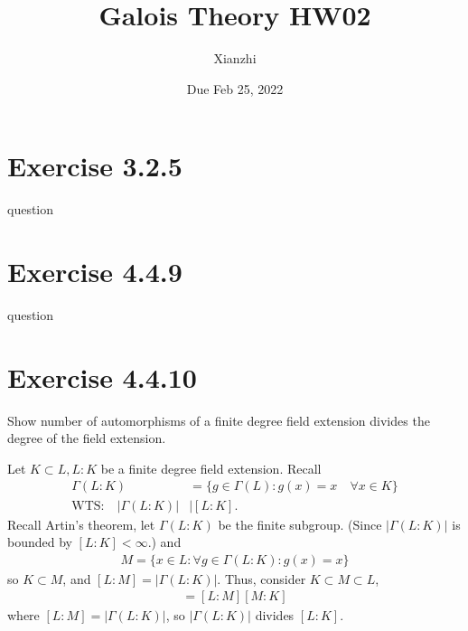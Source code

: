 \documentclass[12pt,english]{article}
\title{Galois Theory HW02}
\author{Xianzhi}
\date{Due Feb 25, 2022}
\begin{document}
\maketitle

\section*{Exercise 3.2.5}
\begin{question}
    question
\end{question}

\section*{Exercise 4.4.9}
\begin{question}
    question
\end{question}

\section*{Exercise 4.4.10}
\begin{question}
Show number of automorphisms of a finite degree field extension divides the degree of the field extension. 
\end{question}
Let $K \subset L, L:K$ be a finite degree field extension. Recall
\begin{align*}
    \Gamma(L:K) &= \{g \in \Gamma(L): g(x) = x \quad \forall x \in K\}\\
    \text{WTS:} \quad |\Gamma(L:K)| &\mid [L:K].
\end{align*} Recall Artin's theorem, let $\Gamma(L:K)$ be the finite subgroup. (Since $|\Gamma(L:K)|$ is bounded by $[L:K]<\infty$.) and 
\begin{align*}
    M = \{x \in L: \forall g \in \Gamma(L:K): g(x)= x\}
\end{align*} so $K \subset M$, and $[L:M]=|\Gamma(L:K)|$. Thus, consider $K \subset M \subset L$,
\begin{align*}
    [L:K] = [L:M][M:K]
\end{align*} where $[L:M] = |\Gamma(L:K)|$, so $|\Gamma(L:K)|$ divides $[L:K]$.
\end{document}
